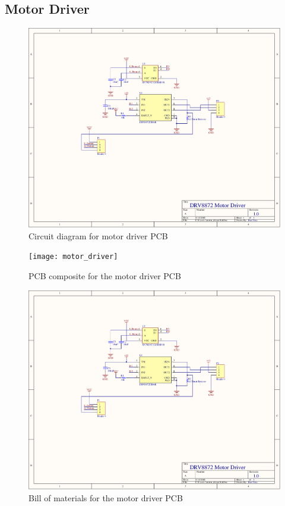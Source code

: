 \begin{flushleft}
\section{Motor Driver}
\end{flushleft}
\label{app:motor_driver}
\begin{figure}[H]
	\centering
	\includegraphics[page=1,scale=0.8,angle=270]{PDFs/motor_driver.PDF} 
	\caption{Circuit diagram for motor driver PCB}
	\label{fig:motor_driver_circuit}
\end{figure}
\newpage
\begin{figure}[H]
	\centering
	\texttt{[image: motor\_driver]} 
	\caption{PCB composite for the motor driver PCB}
	\label{fig:motor_driver_pcb}
\end{figure}
\begin{figure}[H]
	\centering
	\includegraphics[page=3,width=\textwidth]{PDFs/motor_driver.PDF} 
	\caption{Bill of materials for the motor driver PCB}
	\label{fig:motor_driver_bom}
\end{figure}